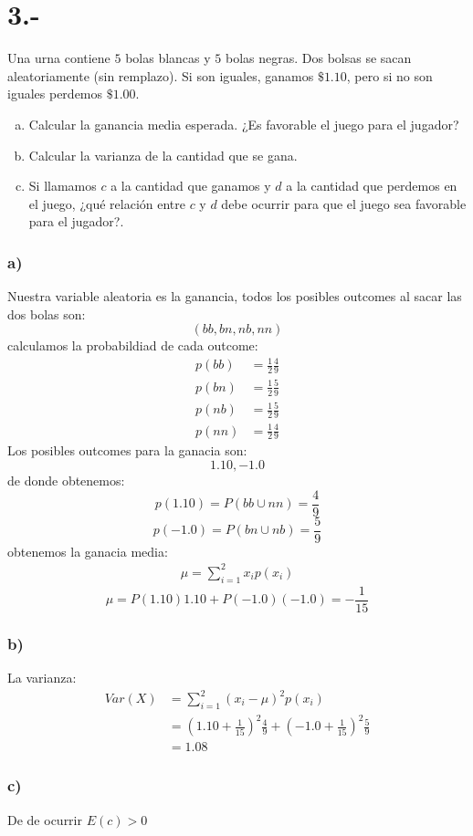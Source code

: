 \documentclass{article}
\begin{document}
\section*{3.-}
Una urna contiene $5$ bolas blancas y $5$ bolas negras. Dos bolsas se sacan aleatoriamente (sin remplazo).
Si son iguales, ganamos $\$1.10$, pero si no son iguales perdemos $\$1.00$.
\begin{enumerate}[a)]
    \item Calcular la ganancia media esperada. ¿Es favorable el juego para el jugador?
    \item Calcular la varianza de la cantidad que se gana.
    \item Si llamamos $c$ a la cantidad que ganamos y $d$ a la cantidad que perdemos en el juego,
    ¿qué relación entre $c$ y $d$ debe ocurrir para que el juego sea favorable para el jugador?.
\end{enumerate}
\begin{tcolorbox}[breakable]
    \subsubsection*{a)}
    Nuestra variable aleatoria es la ganancia, todos los posibles outcomes al sacar las dos bolas son:
    \[ (bb,bn,nb,nn) \]
    calculamos la probabildiad de cada outcome:
    \begin{align*}
        p(bb) 
        &= \frac{1}{2}\frac{4}{9} \\
        p(bn)
        &= \frac{1}{2}\frac{5}{9} \\
        p(nb)
        &= \frac{1}{2}\frac{5}{9} \\ 
        p(nn)
        &= \frac{1}{2}\frac{4}{9}
    \end{align*}
    Los posibles outcomes para la ganacia son:
    \[ 1.10, -1.0 \]
    de donde obtenemos:
    \[ p(1.10) = P(bb \cup nn) = \frac{4}{9} \]
    \[ p(-1.0) = P(bn \cup nb) = \frac{5}{9} \]
    obtenemos la ganacia media:
    \begin{align*}
        \mu = \sum_{i=1}^2 x_ip(x_i)
    \end{align*}
    \[ \mu = P(1.10)1.10 + P(-1.0)(-1.0) = -\frac{1}{15} \]
    \subsubsection*{b)}
    La varianza:
    \begin{align*}
        Var(X)
        &= \sum_{i=1}^2 (x_i - \mu)^2p(x_i) \\ 
        &= (1.10+\tfrac{1}{15})^2\tfrac{4}{9} + (-1.0+\tfrac{1}{15})^2\tfrac{5}{9} \\
        &= 1.08
    \end{align*}

    \subsubsection*{c)}
    De de ocurrir $E(c)>0$

\end{tcolorbox}
\end{document}
